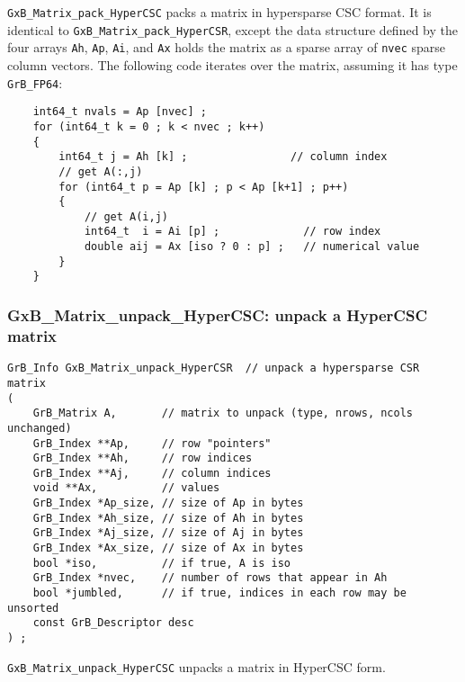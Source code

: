 \documentclass[12pt]{article}
\begin{document}
\verb'GxB_Matrix_pack_HyperCSC' packs a matrix in hypersparse CSC format.
It is identical to \verb'GxB_Matrix_pack_HyperCSR', except the data
structure defined by the four arrays \verb'Ah', \verb'Ap', \verb'Ai', and
\verb'Ax' holds the matrix as a sparse array of \verb'nvec' sparse column
vectors.  The following code iterates over the matrix,
assuming it has type \verb'GrB_FP64':

    \vspace{-0.10in}
    {\footnotesize
    \begin{verbatim}
    int64_t nvals = Ap [nvec] ;
    for (int64_t k = 0 ; k < nvec ; k++)
    {
        int64_t j = Ah [k] ;                // column index
        // get A(:,j)
        for (int64_t p = Ap [k] ; p < Ap [k+1] ; p++)
        {
            // get A(i,j)
            int64_t  i = Ai [p] ;             // row index
            double aij = Ax [iso ? 0 : p] ;   // numerical value
        }
    } \end{verbatim}}

\newpage
\subsubsection{{\sf GxB\_Matrix\_unpack\_HyperCSC:} unpack a HyperCSC matrix}
\label{matrix_unpack_hypercsc}

\begin{mdframed}[userdefinedwidth=6in]
{\footnotesize
\begin{verbatim}
GrB_Info GxB_Matrix_unpack_HyperCSR  // unpack a hypersparse CSR matrix
(
    GrB_Matrix A,       // matrix to unpack (type, nrows, ncols unchanged)
    GrB_Index **Ap,     // row "pointers"
    GrB_Index **Ah,     // row indices
    GrB_Index **Aj,     // column indices
    void **Ax,          // values
    GrB_Index *Ap_size, // size of Ap in bytes
    GrB_Index *Ah_size, // size of Ah in bytes
    GrB_Index *Aj_size, // size of Aj in bytes
    GrB_Index *Ax_size, // size of Ax in bytes
    bool *iso,          // if true, A is iso
    GrB_Index *nvec,    // number of rows that appear in Ah
    bool *jumbled,      // if true, indices in each row may be unsorted
    const GrB_Descriptor desc
) ;
\end{verbatim}
} \end{mdframed}

\verb'GxB_Matrix_unpack_HyperCSC' unpacks a matrix in HyperCSC form.
\end{document}
